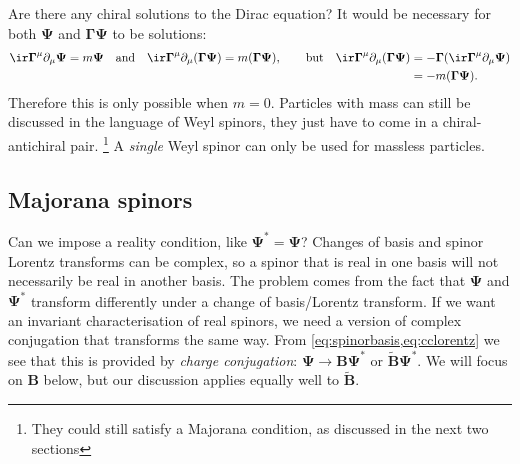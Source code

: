 \documentclass[11pt]{article}
\newcommand{\cc}{^\ast}
\newcommand{\Gammab}{\boldsymbol{\Gamma}}
\newcommand{\B}{\mathbf{B}}
\newcommand{\Bt}{\widetilde{\B}}
\newcommand{\Psib}{\boldsymbol{\Psi}}
\begin{document}
Are there any chiral solutions to the Dirac equation?
It would be necessary for both \(\Psib\) and \(\Gammab \Psib\) to be solutions:
%
\begin{equation*}
  \ir \Gammab^\mu \partial_\mu \Psib = m \Psib
  \quad \text{and} \quad
  \ir \Gammab^\mu \partial_\mu (\Gammab \Psib) = m (\Gammab \Psib),
  \qquad \text{but} \quad
\begin{aligned}[t]
  \ir \Gammab^\mu \partial_\mu (\Gammab \Psib)
    &= - \Gammab (\ir \Gammab^\mu \partial_\mu \Psib) \\
    &= - m (\Gammab \Psib).
\end{aligned}
\end{equation*}
%
Therefore this is only possible when \(m=0\).
Particles with mass can still be discussed in the language of Weyl spinors, they just have to come in a chiral-antichiral pair.%
\footnote{They could still satisfy a Majorana condition, as discussed in the next two sections}
A \emph{single} Weyl spinor can only be used for massless particles.


\subsection{Majorana spinors}\label{sec:majorana}

Can we impose a reality condition, like \(\Psib\cc = \Psib\)?
Changes of basis and spinor Lorentz transforms can be complex, so a spinor that is real in one basis will not necessarily be real in another basis.
The problem comes from the fact that \(\Psib\) and \(\Psib\cc\) transform differently under a change of basis/Lorentz transform.
If we want an invariant characterisation of real spinors, we need a version of complex conjugation that transforms the same way.
From \cref{eq:spinorbasis,eq:cclorentz} we see that this is provided by \emph{charge conjugation}: \( \Psib \to \B \Psib\cc \) or \( \Bt \Psib\cc \).
We will focus on \(\B\) below, but our discussion applies equally well to \(\Bt\).
\end{document}

